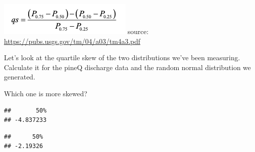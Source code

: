 \documentclass[
]{book}
\newenvironment{Shaded}{\begin{snugshade}}{\end{snugshade}}
\newcommand{\DecValTok}[1]{\textcolor[rgb]{0.00,0.00,0.81}{#1}}
\newcommand{\FunctionTok}[1]{\textcolor[rgb]{0.00,0.00,0.00}{#1}}
\newcommand{\NormalTok}[1]{#1}
\newcommand{\OtherTok}[1]{\textcolor[rgb]{0.56,0.35,0.01}{#1}}
\newcommand{\SpecialCharTok}[1]{\textcolor[rgb]{0.00,0.00,0.00}{#1}}
\begin{document}
\includegraphics{images/Screen Shot 2021-01-25 at 11.27.14 AM.png} source: \url{https://pubs.usgs.gov/tm/04/a03/tm4a3.pdf}

Let's look at the quartile skew of the two distributions we've been measuring. Calculate it for the pineQ discharge data and the random normal distribution we generated.

Which one is more skewed?

\begin{Shaded}
\end{Shaded}

\begin{verbatim}
##       50% 
## -4.837233
\end{verbatim}

\begin{Shaded}
\end{Shaded}

\begin{verbatim}
##      50% 
## -2.19326
\end{verbatim}
\end{document}
